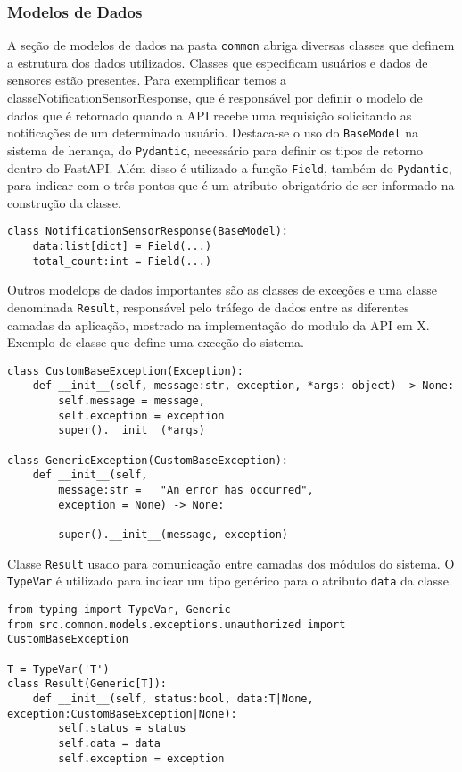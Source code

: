 \subsubsection{Modelos de Dados}
A seção de modelos de dados na pasta \texttt{common} abriga diversas classes que definem a estrutura dos dados utilizados. Classes que especificam usuários e dados de sensores estão presentes. 
Para exemplificar temos a  classeNotificationSensorResponse, que é responsável por definir o modelo de dados que é retornado quando a API recebe uma requisição solicitando as notificações de um determinado usuário. Destaca-se o uso do \texttt{BaseModel} na sistema de herança, do \texttt{Pydantic}, necessário para definir os tipos de retorno dentro do FastAPI. Além disso é utilizado a função \texttt{Field}, também do \texttt{Pydantic}, para indicar com o três pontos que é um atributo obrigatório de ser informado na construção da classe.

\begin{verbatim}
class NotificationSensorResponse(BaseModel):
    data:list[dict] = Field(...)
    total_count:int = Field(...)
\end{verbatim}

Outros modelops de dados importantes são as classes de exceções e uma classe denominada \texttt{Result}, responsável pelo tráfego de dados entre as diferentes camadas da aplicação, mostrado na implementação do modulo da API em X.%
Exemplo de classe que define uma exceção do sistema.
\begin{verbatim}
class CustomBaseException(Exception):
    def __init__(self, message:str, exception, *args: object) -> None:
        self.message = message,
        self.exception = exception
        super().__init__(*args)

class GenericException(CustomBaseException):
    def __init__(self,
        message:str =   "An error has occurred",
        exception = None) -> None:

        super().__init__(message, exception)
\end{verbatim}


Classe \texttt{Result} usado para comunicação entre camadas dos módulos do sistema. O \texttt{TypeVar} é utilizado para indicar um tipo genérico para o atributo \texttt{data} da classe.

\begin{verbatim}
from typing import TypeVar, Generic
from src.common.models.exceptions.unauthorized import CustomBaseException

T = TypeVar('T')
class Result(Generic[T]):
    def __init__(self, status:bool, data:T|None, exception:CustomBaseException|None):
        self.status = status
        self.data = data
        self.exception = exception
\end{verbatim}

